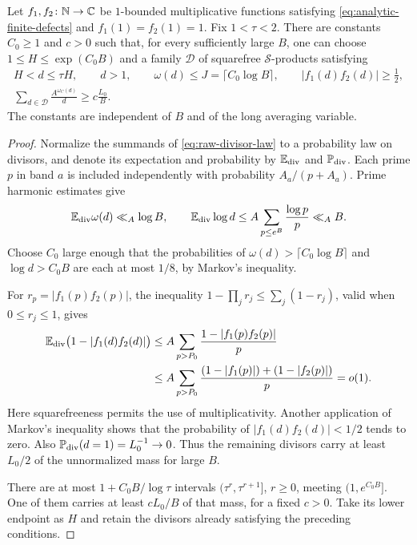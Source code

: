 \begin{lemma}
\label{lem:raw-bin}
Let $f_1,f_2\colon\mathbb N\to\mathbb C$ be $1$-bounded multiplicative functions
satisfying \eqref{eq:analytic-finite-defects} and $f_1(1)=f_2(1)=1$.
Fix $1<\tau<2$. There are constants $C_0\ge1$ and
$c>0$ such that, for every sufficiently large $B$, one can choose
$1\le H\le\exp(C_0B)$ and a family $\mathcal D$ of squarefree
$\mathcal S$-products satisfying
\begin{gather}
 H<d\le\tau H,\qquad d>1,\qquad
 \omega(d)\le J=\lceil C_0\log B\rceil,
 \qquad |f_1(d)f_2(d)|\ge\tfrac12,
 \label{eq:raw-selected-divisors}\\
 \sum_{d\in\mathcal D}\frac{A^{\omega_C(d)}}d
 \ge c\frac{L_0}{B}.
 \label{eq:raw-bin-mass}
\end{gather}
The constants are independent of $B$ and of the long averaging variable.
\end{lemma}
\begin{proof}
Normalize the summands of \eqref{eq:raw-divisor-law} to a probability
law on divisors, and denote its expectation and probability by
$\mathbb E_{\mathrm{div}}$ and $\mathbb P_{\mathrm{div}}$. Each prime $p$ in band $a$
is included independently with
probability $A_a/(p+A_a)$. Prime harmonic estimates give
\[
 \mathbb E_{\mathrm{div}}\omega(d)\ll_A\log B,
 \qquad
 \mathbb E_{\mathrm{div}}\log d\le A\sum_{p\le e^B}\frac{\log p}{p}\ll_A B.
\]
Choose $C_0$ large enough that the probabilities of
$\omega(d)>\lceil C_0\log B\rceil$ and $\log d>C_0B$ are each at most
$1/8$, by Markov's inequality.

For $r_p=|f_1(p)f_2(p)|$, the inequality
$1-\prod_j r_j\le\sum_j(1-r_j)$, valid when $0\le r_j\le1$, gives
\begin{align*}
 \mathbb E_{\mathrm{div}}\bigl(1-|f_1(d)f_2(d)|\bigr)
 &\le A\sum_{p>P_0}\frac{1-|f_1(p)f_2(p)|}{p}\\
 &\le A\sum_{p>P_0}\frac{(1-|f_1(p)|)+(1-|f_2(p)|)}p=o(1).
\end{align*}
Here squarefreeness permits the use of multiplicativity.
Another application of Markov's inequality shows that the probability
of $|f_1(d)f_2(d)|<1/2$ tends to zero. Also
$\mathbb P_{\mathrm{div}}(d=1)=L_0^{-1}\to0$.
Thus the remaining divisors carry at least $L_0/2$ of the unnormalized
mass for large $B$.

There are at most $1+C_0B/\log\tau$ intervals
$(\tau^r,\tau^{r+1}]$, $r\ge0$, meeting $(1,e^{C_0B}]$.
One of them carries at least $cL_0/B$ of that mass, for a fixed $c>0$.
Take its lower endpoint as $H$ and retain the divisors already satisfying
the preceding conditions.
\end{proof}

